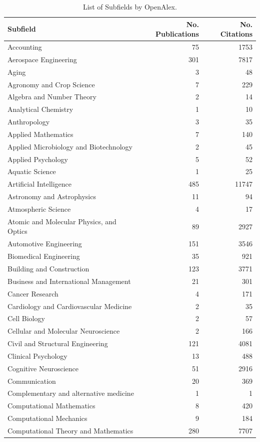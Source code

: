 \documentclass[
  12pt,
]{article}
\begin{document}
\begin{longtable}[t]{|>{}lr>{}r|}
\caption{\label{tab:list of subfields}List of Subfields by OpenAlex.}\\
\toprule
Subfield & No. Publications & No. Citations\\
\midrule
Accounting & 75 & 1753\\
Aerospace Engineering & 301 & 7817\\
Aging & 3 & 48\\
Agronomy and Crop Science & 7 & 229\\
Algebra and Number Theory & 2 & 14\\
Analytical Chemistry & 1 & 10\\
Anthropology & 3 & 35\\
Applied Mathematics & 7 & 140\\
Applied Microbiology and Biotechnology & 2 & 45\\
Applied Psychology & 5 & 52\\
Aquatic Science & 1 & 25\\
Artificial Intelligence & 485 & 11747\\
Astronomy and Astrophysics & 11 & 94\\
Atmospheric Science & 4 & 17\\
Atomic and Molecular Physics, and Optics & 89 & 2927\\
Automotive Engineering & 151 & 3546\\
Biomedical Engineering & 35 & 921\\
Building and Construction & 123 & 3771\\
Business and International Management & 21 & 301\\
Cancer Research & 4 & 171\\
Cardiology and Cardiovascular Medicine & 2 & 35\\
Cell Biology & 2 & 57\\
Cellular and Molecular Neuroscience & 2 & 166\\
Civil and Structural Engineering & 121 & 4081\\
Clinical Psychology & 13 & 488\\
Cognitive Neuroscience & 51 & 2916\\
Communication & 20 & 369\\
Complementary and alternative medicine & 1 & 1\\
Computational Mathematics & 8 & 420\\
Computational Mechanics & 9 & 184\\
Computational Theory and Mathematics & 280 & 7707\\

\end{longtable}
\end{document}

